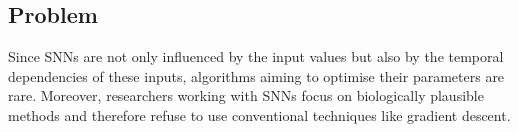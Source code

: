 \subsection{Problem}
\label{subsec:problem}

Since \acp{SNN} are not only influenced by the input values but also by the temporal dependencies of these inputs, algorithms aiming to optimise their parameters are rare.
Moreover, researchers working with \acp{SNN} focus on biologically plausible methods and therefore refuse to use conventional techniques like gradient descent.